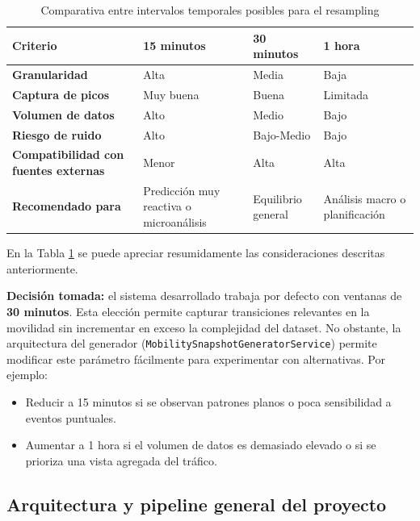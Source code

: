\begin{table}[H]
	\centering
	\caption{Comparativa entre intervalos temporales posibles para el resampling}
	\label{tab:resample_comparison}
	\renewcommand{\arraystretch}{1.4}
	\begin{tabularx}{\textwidth}{lXXX}
		\toprule
		\textbf{Criterio} & \textbf{15 minutos} & \textbf{30 minutos} & \textbf{1 hora} \\
		\midrule
		\textbf{Granularidad} & Alta & Media & Baja \\
		\textbf{Captura de picos} & Muy buena & Buena & Limitada \\
		\textbf{Volumen de datos} & Alto & Medio & Bajo \\
		\textbf{Riesgo de ruido} & Alto & Bajo-Medio & Bajo \\
		\textbf{Compatibilidad con fuentes externas} & Menor & Alta & Alta \\
		\textbf{Recomendado para} &
		Predicción muy reactiva o microanálisis &
		Equilibrio general &
		Análisis macro o planificación \\
		\bottomrule
	\end{tabularx}
\end{table}

En la Tabla \ref{tab:resample_comparison} se puede apreciar resumidamente las consideraciones descritas anteriormente.

\vspace{1em}
\noindent \textbf{Decisión tomada:} el sistema desarrollado trabaja por defecto con ventanas de \textbf{30 minutos}. Esta elección permite capturar transiciones relevantes en la movilidad sin incrementar en exceso la complejidad del dataset. No obstante, la arquitectura del generador (\texttt{MobilitySnapshotGeneratorService}) permite modificar este parámetro fácilmente para experimentar con alternativas. Por ejemplo:

\begin{itemize}
	\item Reducir a 15 minutos si se observan patrones planos o poca sensibilidad a eventos puntuales.
	\item Aumentar a 1 hora si el volumen de datos es demasiado elevado o si se prioriza una vista agregada del tráfico.
\end{itemize}

\subsection{Arquitectura y pipeline general del proyecto}

